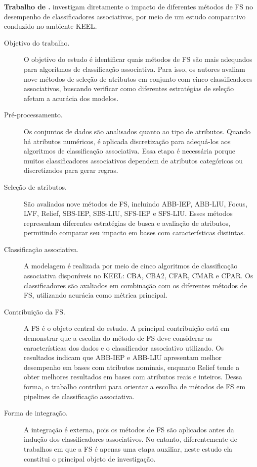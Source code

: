 \textbf{Trabalho de .} 
 investigam diretamente o impacto de diferentes métodos de FS no desempenho de classificadores associativos, por meio de um estudo comparativo conduzido no ambiente KEEL.

\begin{description}
    \item[Objetivo do trabalho.] O objetivo do estudo é identificar quais métodos de FS são mais adequados para algoritmos de classificação associativa. Para isso, os autores avaliam nove métodos de seleção de atributos em conjunto com cinco classificadores associativos, buscando verificar como diferentes estratégias de seleção afetam a acurácia dos modelos.

    \item[Pré-processamento.] Os conjuntos de dados são analisados quanto ao tipo de atributos. Quando há atributos numéricos, é aplicada discretização para adequá-los aos algoritmos de classificação associativa. Essa etapa é necessária porque muitos classificadores associativos dependem de atributos categóricos ou discretizados para gerar regras.

    \item[Seleção de atributos.] São avaliados nove métodos de FS, incluindo ABB-IEP, ABB-LIU, Focus, LVF, Relief, SBS-IEP, SBS-LIU, SFS-IEP e SFS-LIU. Esses métodos representam diferentes estratégias de busca e avaliação de atributos, permitindo comparar seu impacto em bases com características distintas.

    \item[Classificação associativa.] A modelagem é realizada por meio de cinco algoritmos de classificação associativa disponíveis no KEEL: CBA, CBA2, CFAR, CMAR e CPAR. Os classificadores são avaliados em combinação com os diferentes métodos de FS, utilizando acurácia como métrica principal.

    \item[Contribuição da FS.] A FS é o objeto central do estudo. A principal contribuição está em demonstrar que a escolha do método de FS deve considerar as características dos dados e o classificador associativo utilizado. Os resultados indicam que ABB-IEP e ABB-LIU apresentam melhor desempenho em bases com atributos nominais, enquanto Relief tende a obter melhores resultados em bases com atributos reais e inteiros. Dessa forma, o trabalho contribui para orientar a escolha de métodos de FS em pipelines de classificação associativa.

    \item[Forma de integração.] A integração é externa, pois os métodos de FS são aplicados antes da indução dos classificadores associativos. No entanto, diferentemente de trabalhos em que a FS é apenas uma etapa auxiliar, neste estudo ela constitui o principal objeto de investigação.
\end{description}



